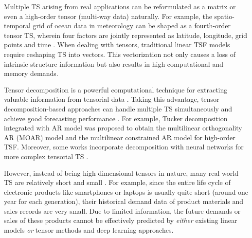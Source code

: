 \documentclass[letterpaper]{article} %
\numberwithin{theorem}{section}
\begin{document}
	Multiple TS arising from real applications  can be reformulated as a matrix or even a high-order  tensor (multi-way data) naturally. For example,  the spatio-temporal grid of ocean data in meteorology can be shaped as  a fourth-order tensor TS, wherein four factors are jointly represented as latitude, longitude, grid points and time \cite{jing2018high}. When
	dealing with tensors, traditional linear TSF models require reshaping  TS into vectors. This vectorization not only  causes a loss of
	intrinsic structure information but also  results in  high computational and memory demands.

	Tensor decomposition is a powerful computational technique for extracting valuable information from tensorial data \cite{cichocki2016tensor,shi2018feature,zhou2019probabilistic,zhou2019bayesian}. Taking this advantage, tensor decomposition-based   approaches can handle  multiple   TS simultaneously and achieve good  forecasting performance \cite{dunlavy2011temporal,li2015tensor,tan2016short,bhanu2018forecasting,faloutsos2018forecasting}.
	For example,   Tucker decomposition  integrated with   AR model was proposed   \cite{jing2018high}     to  obtain    the multilinear orthogonality  AR (MOAR) model and the multilinear constrained AR model for high-order TSF. Moreover, some works incorporate  decomposition with neural networks for more complex  tensorial TS \cite{yu2017long,ma2019large}.

	However, instead of being high-dimensional tensors in nature, many real-world TS are relatively short and small \cite{smyl2016data}.
	For example,  since the entire   life  cycle of    electronic products like smartphones or laptops   is usually  quite short (around one year for each generation),  their  historical demand data of product materials and sales records are   very  small. Due to limited information,    the future demands or sales of these products cannot be effectively predicted  by \textit{either} existing linear models  \textit{or}   tensor methods  and  deep learning approaches.
\end{document}

